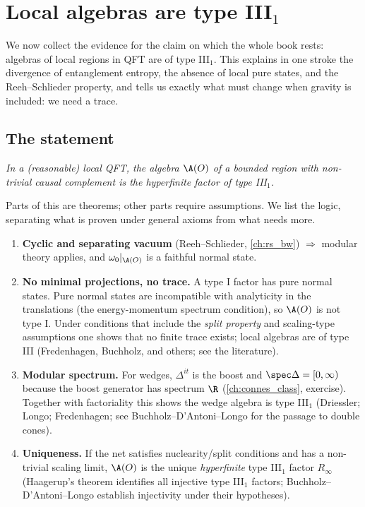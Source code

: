 \chapter{Local algebras are type III$_1$}\label{ch:typeIII_local}

\begin{physmotiv}
We now collect the evidence for the claim on which the whole book rests: algebras of local regions in QFT are of type III$_1$. This explains in one stroke the divergence of entanglement entropy, the absence of local pure states, and the Reeh--Schlieder property, and tells us exactly what must change when gravity is included: we need a trace.
\end{physmotiv}

\section{The statement}

\begin{center}
\emph{In a (reasonable) local QFT, the algebra $\A(O)$ of a bounded region with non-trivial causal complement is the hyperfinite factor of type III$_1$.}
\end{center}

Parts of this are theorems; other parts require assumptions. We list the logic, separating what is proven under general axioms from what needs more.

\begin{enumerate}
\item \textbf{Cyclic and separating vacuum} (Reeh--Schlieder, \cref{ch:rs_bw}) $\Rightarrow$ modular theory applies, and $\omega_0|_{\A(O)}$ is a faithful normal state.
\item \textbf{No minimal projections, no trace.} A type I factor has pure normal states. Pure normal states are incompatible with analyticity in the translations (the energy-momentum spectrum condition), so $\A(O)$ is not type I. Under conditions that include the \emph{split property} and scaling-type assumptions one shows that no finite trace exists; local algebras are of type III (Fredenhagen, Buchholz, and others; see the literature).
\item \textbf{Modular spectrum.} For wedges, $\Delta^{it}$ is the boost and $\spec\Delta=[0,\infty)$ because the boost generator has spectrum $\R$ (\cref{ch:connes_class}, exercise). Together with factoriality this shows the wedge algebra is type III$_1$ (Driessler; Longo; Fredenhagen; see Buchholz--D'Antoni--Longo for the passage to double cones).
\item \textbf{Uniqueness.} If the net satisfies nuclearity/split conditions and has a non-trivial scaling limit, $\A(O)$ is the unique \emph{hyperfinite} type III$_1$ factor $R_\infty$ (Haagerup's theorem identifies all injective type III$_1$ factors; Buchholz--D'Antoni--Longo establish injectivity under their hypotheses).
\end{enumerate}

